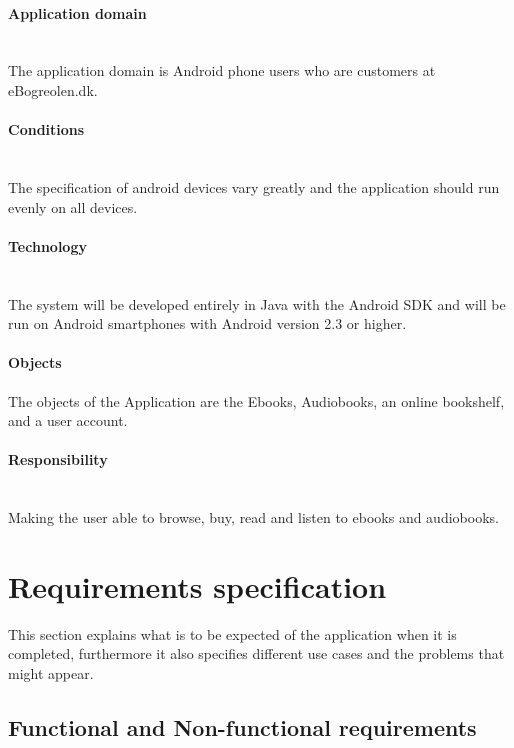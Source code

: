 \message{ !name(Rapport.tex)}\documentclass[12pt]{article}
\begin{document}
\paragraph{Application domain}$ $\\
The application domain is Android phone users who are customers at eBogreolen.dk.
\\
\paragraph{Conditions}$ $\\
The specification of android devices vary greatly and the application should run evenly on all devices.
\\
\paragraph{Technology}$ $\\
The system will be developed entirely in Java with the Android SDK and will be run on Android smartphones with Android version 2.3 or higher.
\paragraph{Objects}
The objects of the Application are the Ebooks, Audiobooks, an online bookshelf, and a user account.
\\
\paragraph{Responsibility}$ $\\
Making the user able to browse, buy, read and listen to ebooks and audiobooks.
\section{Requirements specification}
This section explains what is to be expected of the application when it is completed, furthermore it also specifies different use cases and the problems that might appear.
\subsection{Functional and Non-functional requirements}
\end{document}
